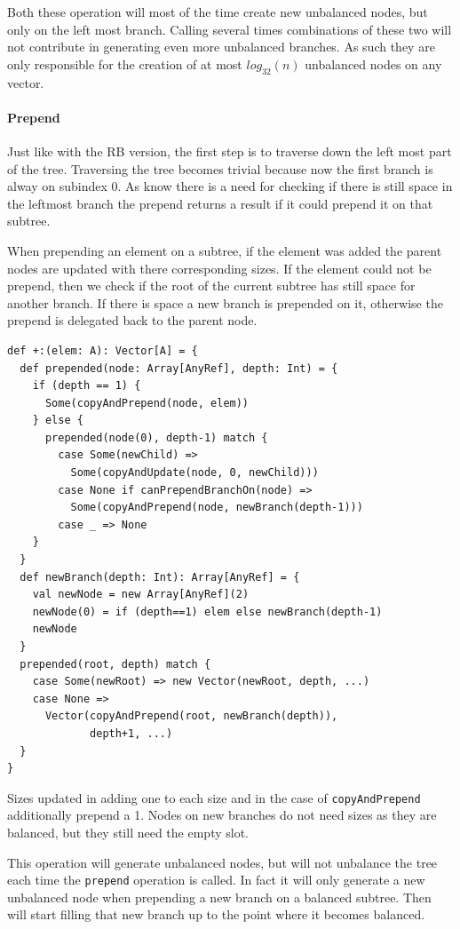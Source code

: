 Both these operation will most of the time create new unbalanced nodes, but only on the left most branch. Calling several times combinations of these two will not contribute in generating even more unbalanced branches. As such they are only responsible for the creation of at most $ log_{32}(n)$ unbalanced nodes on any vector.

\paragraph{Prepend}
Just like with the RB version, the first step is to traverse down the left most part of the tree. Traversing the tree becomes trivial because now the first branch is alway on subindex 0. As know there is a need for checking if there is still space in the leftmost branch the prepend returns a result if it could prepend it on that subtree. 

When prepending an element on a subtree, if the element was added the parent nodes are updated with there corresponding sizes. If the element could not be prepend, then we check if the root of the current subtree has still space for another branch. If there is space a new branch is prepended on it, otherwise the prepend is delegated back to the parent node.

\begin{lstlisting}[frame=single]
def +:(elem: A): Vector[A] = {
  def prepended(node: Array[AnyRef], depth: Int) = {
    if (depth == 1) {
      Some(copyAndPrepend(node, elem))
    } else {
      prepended(node(0), depth-1) match {
        case Some(newChild) => 
          Some(copyAndUpdate(node, 0, newChild)))
        case None if canPrependBranchOn(node) => 
          Some(copyAndPrepend(node, newBranch(depth-1)))
        case _ => None
    }
  }
  def newBranch(depth: Int): Array[AnyRef] = {
    val newNode = new Array[AnyRef](2)
    newNode(0) = if (depth==1) elem else newBranch(depth-1)
    newNode
  }
  prepended(root, depth) match {
    case Some(newRoot) => new Vector(newRoot, depth, ...)  
    case None => 
      Vector(copyAndPrepend(root, newBranch(depth)), 
             depth+1, ...)
  }
}
\end{lstlisting}

Sizes updated in adding one to each size and in the case of \texttt{copyAndPrepend} additionally prepend a 1. Nodes on new branches do not need sizes as they are balanced, but they still need the empty slot.

This operation will generate unbalanced nodes, but will not unbalance the tree each time the \texttt{prepend} operation is called. In fact it will only generate a new unbalanced node when prepending a new branch on a balanced subtree. Then will start filling that new branch up to the point where it becomes balanced. 

